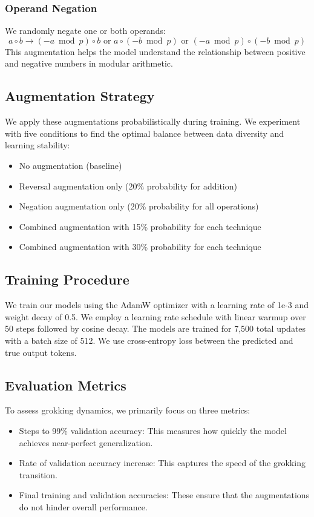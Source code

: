 \documentclass{article} %
\begin{document}
\subsubsection{Operand Negation}
We randomly negate one or both operands:
\begin{equation}
    a \circ b \rightarrow (-a \bmod p) \circ b \text{ or } a \circ (-b \bmod p) \text{ or } (-a \bmod p) \circ (-b \bmod p)
\end{equation}
This augmentation helps the model understand the relationship between positive and negative numbers in modular arithmetic.

\subsection{Augmentation Strategy}
We apply these augmentations probabilistically during training. We experiment with five conditions to find the optimal balance between data diversity and learning stability:
\begin{itemize}
    \item No augmentation (baseline)
    \item Reversal augmentation only (20\% probability for addition)
    \item Negation augmentation only (20\% probability for all operations)
    \item Combined augmentation with 15\% probability for each technique
    \item Combined augmentation with 30\% probability for each technique
\end{itemize}

\subsection{Training Procedure}
We train our models using the AdamW optimizer \cite{loshchilov2017adamw} with a learning rate of 1e-3 and weight decay of 0.5. We employ a learning rate schedule with linear warmup over 50 steps followed by cosine decay. The models are trained for 7,500 total updates with a batch size of 512. We use cross-entropy loss between the predicted and true output tokens.

\subsection{Evaluation Metrics}
To assess grokking dynamics, we primarily focus on three metrics:
\begin{itemize}
    \item Steps to 99\% validation accuracy: This measures how quickly the model achieves near-perfect generalization.
    \item Rate of validation accuracy increase: This captures the speed of the grokking transition.
    \item Final training and validation accuracies: These ensure that the augmentations do not hinder overall performance.
\end{itemize}
\end{document}
